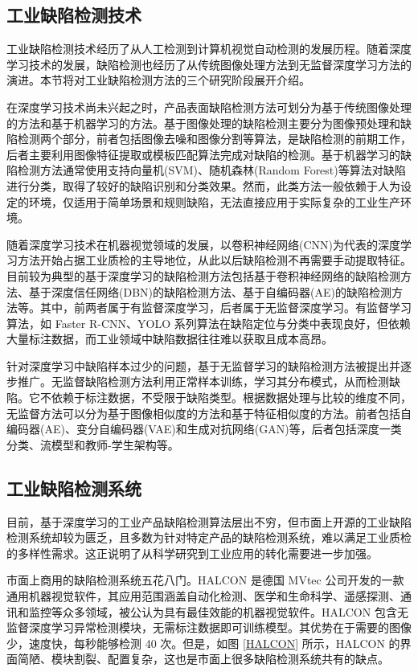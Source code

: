 \documentclass[
  ]{njuthesis}
\begin{document}
\subsection{工业缺陷检测技术}

工业缺陷检测技术经历了从人工检测到计算机视觉自动检测的发展历程。随着深度学习技术的发展，缺陷检测也经历了从传统图像处理方法到无监督深度学习方法的演进。本节将对工业缺陷检测方法的三个研究阶段展开介绍。

在深度学习技术尚未兴起之时，产品表面缺陷检测方法可划分为基于传统图像处理的方法和基于机器学习的方法\cite{[8]}。基于图像处理的缺陷检测主要分为图像预处理和缺陷检测两个部分，前者包括图像去噪和图像分割等算法，是缺陷检测的前期工作，后者主要利用图像特征提取或模板匹配算法完成对缺陷的检测\cite{[6]}。基于机器学习的缺陷检测方法通常使用支持向量机(SVM)、随机森林(Random Forest)等算法对缺陷进行分类，取得了较好的缺陷识别和分类效果。然而，此类方法一般依赖于人为设定的环境，仅适用于简单场景和规则缺陷，无法直接应用于实际复杂的工业生产环境。

随着深度学习技术在机器视觉领域的发展，以卷积神经网络(CNN)为代表的深度学习方法开始占据工业质检的主导地位，从此以后缺陷检测不再需要手动提取特征。目前较为典型的基于深度学习的缺陷检测方法包括基于卷积神经网络的缺陷检测方法、基于深度信任网络(DBN)的缺陷检测方法、基于自编码器(AE)的缺陷检测方法等。其中，前两者属于有监督深度学习，后者属于无监督深度学习\cite{[6]}。有监督学习算法，如 Faster R-CNN、YOLO 系列算法在缺陷定位与分类中表现良好，但依赖大量标注数据，而工业领域中缺陷数据往往难以获取且成本高昂。

针对深度学习中缺陷样本过少的问题，基于无监督学习的缺陷检测方法被提出并逐步推广。无监督缺陷检测方法利用正常样本训练，学习其分布模式，从而检测缺陷。它不依赖于标注数据，不受限于缺陷类型。根据数据处理与比较的维度不同，无监督方法可以分为基于图像相似度的方法和基于特征相似度的方法。前者包括自编码器(AE)、变分自编码器(VAE)和生成对抗网络(GAN)等，后者包括深度一类分类、流模型和教师-学生架构等\cite{[1]}。

\subsection{工业缺陷检测系统}

目前，基于深度学习的工业产品缺陷检测算法层出不穷，但市面上开源的工业缺陷检测系统却较为匮乏，且多数为针对特定产品的缺陷检测系统，难以满足工业质检的多样性需求。这正说明了从科学研究到工业应用的转化需要进一步加强。

市面上商用的缺陷检测系统五花八门。HALCON 是德国 MVtec 公司开发的一款通用机器视觉软件，其应用范围涵盖自动化检测、医学和生命科学、遥感探测、通讯和监控等众多领域，被公认为具有最佳效能的机器视觉软件。HALCON 包含无监督深度学习异常检测模块，无需标注数据即可训练模型。其优势在于需要的图像少，速度快，每秒能够检测 40 次。但是，如图 \ref{HALCON} 所示，HALCON 的界面简陋、模块割裂、配置复杂，这也是市面上很多缺陷检测系统共有的缺点。
\end{document}
